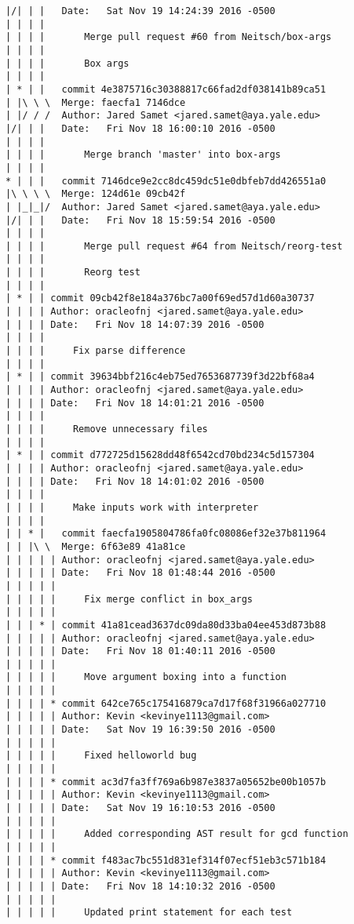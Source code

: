 \begin{lstlisting}
|/| | |   Date:   Sat Nov 19 14:24:39 2016 -0500
| | | |   
| | | |       Merge pull request #60 from Neitsch/box-args
| | | |       
| | | |       Box args
| | | |       
| * | |   commit 4e3875716c30388817c66fad2df038141b89ca51
| |\ \ \  Merge: faecfa1 7146dce
| |/ / /  Author: Jared Samet <jared.samet@aya.yale.edu>
|/| | |   Date:   Fri Nov 18 16:00:10 2016 -0500
| | | |   
| | | |       Merge branch 'master' into box-args
| | | |       
* | | |   commit 7146dce9e2cc8dc459dc51e0dbfeb7dd426551a0
|\ \ \ \  Merge: 124d61e 09cb42f
| |_|_|/  Author: Jared Samet <jared.samet@aya.yale.edu>
|/| | |   Date:   Fri Nov 18 15:59:54 2016 -0500
| | | |   
| | | |       Merge pull request #64 from Neitsch/reorg-test
| | | |       
| | | |       Reorg test
| | | |     
| * | | commit 09cb42f8e184a376bc7a00f69ed57d1d60a30737
| | | | Author: oracleofnj <jared.samet@aya.yale.edu>
| | | | Date:   Fri Nov 18 14:07:39 2016 -0500
| | | | 
| | | |     Fix parse difference
| | | |     
| * | | commit 39634bbf216c4eb75ed7653687739f3d22bf68a4
| | | | Author: oracleofnj <jared.samet@aya.yale.edu>
| | | | Date:   Fri Nov 18 14:01:21 2016 -0500
| | | | 
| | | |     Remove unnecessary files
| | | |     
| * | | commit d772725d15628dd48f6542cd70bd234c5d157304
| | | | Author: oracleofnj <jared.samet@aya.yale.edu>
| | | | Date:   Fri Nov 18 14:01:02 2016 -0500
| | | | 
| | | |     Make inputs work with interpreter
| | | |       
| | * |   commit faecfa1905804786fa0fc08086ef32e37b811964
| | |\ \  Merge: 6f63e89 41a81ce
| | | | | Author: oracleofnj <jared.samet@aya.yale.edu>
| | | | | Date:   Fri Nov 18 01:48:44 2016 -0500
| | | | | 
| | | | |     Fix merge conflict in box_args
| | | | |      
| | | * | commit 41a81cead3637dc09da80d33ba04ee453d873b88
| | | | | Author: oracleofnj <jared.samet@aya.yale.edu>
| | | | | Date:   Fri Nov 18 01:40:11 2016 -0500
| | | | | 
| | | | |     Move argument boxing into a function
| | | | |      
| | | | * commit 642ce765c175416879ca7d17f68f31966a027710
| | | | | Author: Kevin <kevinye1113@gmail.com>
| | | | | Date:   Sat Nov 19 16:39:50 2016 -0500
| | | | | 
| | | | |     Fixed helloworld bug
| | | | |      
| | | | * commit ac3d7fa3ff769a6b987e3837a05652be00b1057b
| | | | | Author: Kevin <kevinye1113@gmail.com>
| | | | | Date:   Sat Nov 19 16:10:53 2016 -0500
| | | | | 
| | | | |     Added corresponding AST result for gcd function
| | | | |      
| | | | * commit f483ac7bc551d831ef314f07ecf51eb3c571b184
| | | | | Author: Kevin <kevinye1113@gmail.com>
| | | | | Date:   Fri Nov 18 14:10:32 2016 -0500
| | | | | 
| | | | |     Updated print statement for each test

\end{lstlisting}
